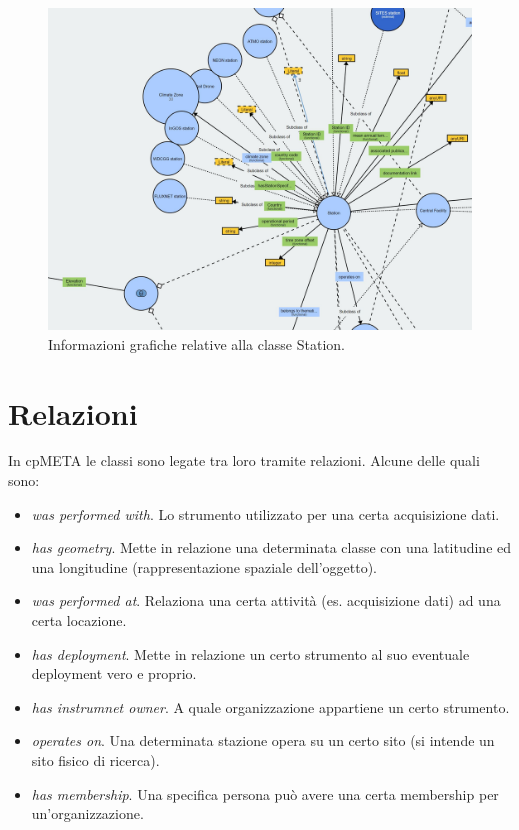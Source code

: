 \begin{figure}[h!]
    \centering
    \includegraphics[height=0.6\textwidth]{figures/stationOWLGraph.JPG}
    \caption{Informazioni grafiche relative alla classe Station.}
    \label{figure:stationclassgraph}
\end{figure}

\newpage



\section{Relazioni}
\label{section:relazioni}
In cpMETA le classi sono legate tra loro tramite relazioni. Alcune delle quali sono:
\begin{itemize}
    \item \textit{was performed with}. Lo strumento utilizzato per una certa acquisizione dati.
    \item \textit{has geometry}. Mette in relazione una determinata classe con una latitudine ed una longitudine (rappresentazione spaziale dell'oggetto).
    \item \textit{was performed at}. Relaziona una certa attività (es. acquisizione dati) ad una certa locazione.
    \item \textit{has deployment}. Mette in relazione un certo strumento al suo eventuale deployment vero e proprio.
    \item \textit{has instrumnet owner}. A quale organizzazione appartiene un certo strumento.
    \item \textit{operates on}. Una determinata stazione opera su un certo sito (si intende un sito fisico di ricerca).
    \item \textit{has membership}. Una specifica persona può avere una certa membership per un'organizzazione.
\end{itemize}

